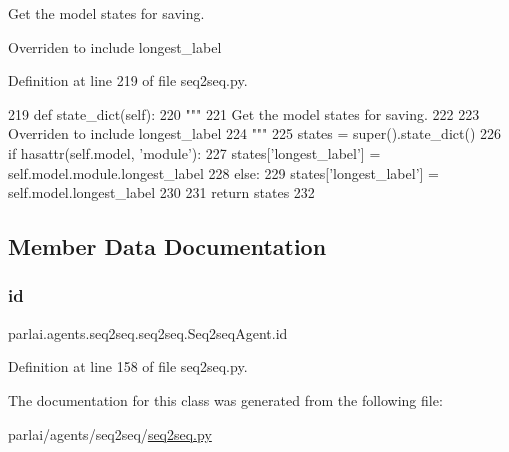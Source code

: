 \begin{DoxyVerb}Get the model states for saving.

Overriden to include longest_label
\end{DoxyVerb}
 

Definition at line 219 of file seq2seq.\+py.


\begin{DoxyCode}
219     \textcolor{keyword}{def }state\_dict(self):
220         \textcolor{stringliteral}{"""}
221 \textcolor{stringliteral}{        Get the model states for saving.}
222 \textcolor{stringliteral}{}
223 \textcolor{stringliteral}{        Overriden to include longest\_label}
224 \textcolor{stringliteral}{        """}
225         states = super().state\_dict()
226         \textcolor{keywordflow}{if} hasattr(self.model, \textcolor{stringliteral}{'module'}):
227             states[\textcolor{stringliteral}{'longest\_label'}] = self.model.module.longest\_label
228         \textcolor{keywordflow}{else}:
229             states[\textcolor{stringliteral}{'longest\_label'}] = self.model.longest\_label
230 
231         \textcolor{keywordflow}{return} states
232 
\end{DoxyCode}


\subsection{Member Data Documentation}
\mbox{\label{classparlai_1_1agents_1_1seq2seq_1_1seq2seq_1_1Seq2seqAgent_a5254266798a52da5d4df057f5d8dc213}} 
\subsubsection{\texorpdfstring{id}{id}}
{\footnotesize\ttfamily parlai.\+agents.\+seq2seq.\+seq2seq.\+Seq2seq\+Agent.\+id}



Definition at line 158 of file seq2seq.\+py.



The documentation for this class was generated from the following file\+:\begin{DoxyCompactItemize}
\item 
parlai/agents/seq2seq/\hyperlink{agents_2seq2seq_2seq2seq_8py}{seq2seq.\+py}\end{DoxyCompactItemize}
